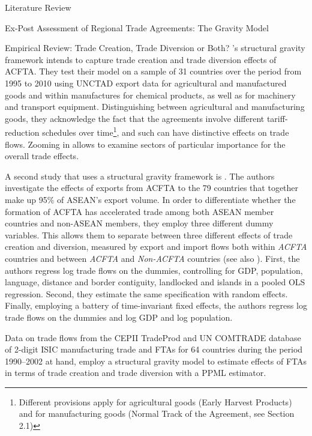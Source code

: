 \begin{section}{Literature Review}
\begin{subsection}{Ex-Post Assessment of Regional Trade Agreements: The Gravity Model}
\begin{subsubsection}{Empirical Review: Trade Creation, Trade Diversion or Both?}
\cite{smz2014}'s structural gravity framework intends to capture trade creation and trade diversion effects of ACFTA. They test their model on a sample of 31 countries over the period from 1995 to 2010 using UNCTAD export data for agricultural and manufactured goods and within manufactures for chemical products, as well as for machinery and transport equipment. Distinguishing between agricultural and manufacturing goods, they acknowledge the fact that the agreements involve different tariff-reduction schedules over time\footnote{Different provisions apply for agricultural goods (Early Harvest Products) and for manufacturing goods (Normal Track of the Agreement, see Section 2.1)}, and such can have distinctive effects on trade flows. Zooming in allows to examine sectors of particular importance for the overall trade effects.

A second study that uses a structural gravity framework is \cite{wla_2021}. The authors investigate the effects of exports from ACFTA to the 79 countries that together make up 95\% of ASEAN's export volume. In order to differentiate whether the formation of ACFTA has accelerated trade among both ASEAN member countries and non-ASEAN members, they employ three different dummy variables.  This allows them to separate between three different effects of trade creation and diversion, measured by export and import flows both within \textit{ACFTA} countries and between \textit{ACFTA} and \textit{Non-ACFTA} countries (see also \cite{carrere_2006}). First, the authors regress log trade flows on the dummies, controlling for GDP, population, language, distance and border contiguity, landlocked and islands in a pooled OLS regression. Second, they estimate the same specification with random effects. Finally, employing a battery of time-invariant fixed effects, the authors regress log trade flows on the dummies and log GDP and log population. 

Data on trade flows from the CEPII TradeProd and UN COMTRADE database of 2-digit ISIC manufacturing trade and FTAs for 64 countries during the period 1990–2002 at hand, \cite{dyz_2014} employ a structural gravity model to estimate effects of FTAs in terms of trade creation and trade diversion with a PPML estimator. 


\end{subsubsection}

\end{subsection}

\end{section}